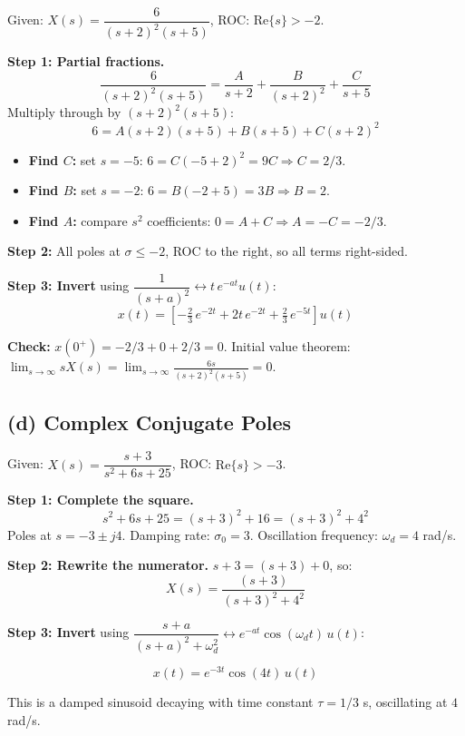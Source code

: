 \documentclass[11pt]{article}
\newcommand{\Res}{\mathrm{Re}}
\begin{document}
Given: $X(s) = \dfrac{6}{(s+2)^2(s+5)}$, ROC: $\Res\{s\} > -2$.

\textbf{Step 1: Partial fractions.}
\[
\frac{6}{(s+2)^2(s+5)} = \frac{A}{s+2} + \frac{B}{(s+2)^2} + \frac{C}{s+5}
\]
Multiply through by $(s+2)^2(s+5)$:
\[
6 = A(s+2)(s+5) + B(s+5) + C(s+2)^2
\]
\begin{itemize}[leftmargin=2em]
\item \textbf{Find $C$:} set $s=-5$: $6 = C(-5+2)^2 = 9C \Rightarrow C = 2/3$.
\item \textbf{Find $B$:} set $s=-2$: $6 = B(-2+5) = 3B \Rightarrow B = 2$.
\item \textbf{Find $A$:} compare $s^2$ coefficients: $0 = A + C \Rightarrow A = -C = -2/3$.
\end{itemize}

\textbf{Step 2:} All poles at $\sigma \le -2$, ROC to the right, so all terms right-sided.

\textbf{Step 3: Invert} using $\dfrac{1}{(s+a)^2} \leftrightarrow t\,e^{-at}u(t)$:
\begin{equation*}
\boxed{x(t) = \left[-\tfrac{2}{3}\,e^{-2t} + 2t\,e^{-2t} + \tfrac{2}{3}\,e^{-5t}\right]u(t)}
\end{equation*}

\textbf{Check:} $x(0^+) = -2/3 + 0 + 2/3 = 0$. Initial value theorem:
$\displaystyle\lim_{s\to\infty}sX(s) = \lim_{s\to\infty}\frac{6s}{(s+2)^2(s+5)} = 0$. \checkmark

\subsection*{(d) Complex Conjugate Poles}

Given: $X(s) = \dfrac{s+3}{s^2+6s+25}$, ROC: $\Res\{s\} > -3$.

\textbf{Step 1: Complete the square.}
\[
s^2 + 6s + 25 = (s+3)^2 + 16 = (s+3)^2 + 4^2
\]
Poles at $s = -3 \pm j4$. Damping rate: $\sigma_0 = 3$. Oscillation frequency: $\omega_d = 4$ rad/s.

\textbf{Step 2: Rewrite the numerator.} $s+3 = (s+3) + 0$, so:
\[
X(s) = \frac{(s+3)}{(s+3)^2 + 4^2}
\]

\textbf{Step 3: Invert} using $\dfrac{s+a}{(s+a)^2 + \omega_d^2} \leftrightarrow e^{-at}\cos(\omega_d t)\,u(t)$:

\begin{equation*}
\boxed{x(t) = e^{-3t}\cos(4t)\,u(t)}
\end{equation*}

This is a damped sinusoid decaying with time constant $\tau = 1/3$ s, oscillating at $4$ rad/s.
\end{document}
